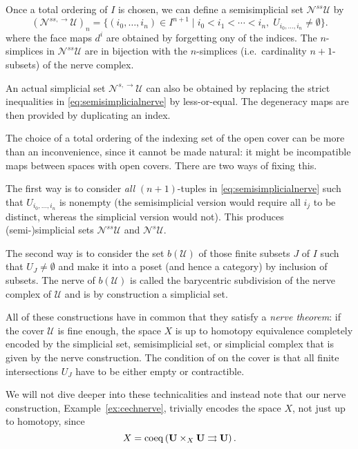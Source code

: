 \documentclass[a4paper,openany]{scrbook}
\begin{document}
Once a total ordering of $I$ is chosen, we can define a semisimplicial set $\mathcal N^{ss}\mathcal U$ by
\begin{equation}\label{eq:semisimplicialnerve}
(\mathcal N^{ss,\to}\mathcal U)_n = \{ (i_0,\dots,i_n) \in I^{n+1} \mid i_0 < i_1 < \cdots < i_n,\; U_{i_0,\dots,i_n} \neq \emptyset\}.
\end{equation}
where the face maps $d^i$ are obtained by forgetting ony of the indices. The $n$-simplices in $\mathcal N^{ss}\mathcal U$ are in bijection with the $n$-simplices (i.e.\ cardinality $n+1$-subsets) of the nerve complex.

An actual simplicial set $\mathcal N^{s,\to}\mathcal U$ can also be obtained by replacing the strict inequalities in \eqref{eq:semisimplicialnerve} by less-or-equal. The degeneracy maps are then provided by duplicating an index.

The choice of a total ordering of the indexing set of the open cover can be more than an inconvenience, since it cannot be made natural: it might be incompatible maps between spaces with open covers. There are two ways of fixing this. 

The first way is to consider \emph{all} $(n+1)$-tuples in \eqref{eq:semisimplicialnerve} such that $U_{i_0,\dots,i_n}$ is nonempty (the semisimplicial version would require all $i_j$ to be distinct, whereas the simplicial version would not). This produces (semi-)simplicial sets $\mathcal N^{ss}\mathcal U$ and $\mathcal N^s\mathcal U$.

The second way is to consider the set $b(\mathcal U)$ of those finite subsets $J$ of $I$ such that $U_J \neq \emptyset$ and make it into a poset (and hence a category) by inclusion of subsets. 
The nerve of $b(\mathcal U)$ is called the barycentric subdivision of the nerve complex of $\mathcal U$ and is by construction a simplicial set.

All of these constructions have in common that they satisfy a \emph{nerve theorem}: if the cover $\mathcal U$ is fine enough, the space $X$ is up to homotopy equivalence completely encoded by the simplicial set, semisimplicial set, or simplicial complex that is given by the nerve construction. The condition of on the cover is that all finite intersections $U_J$ have to be either empty or contractible.

We will not dive deeper into these technicalities and instead note that our nerve construction, Example~\ref{ex:cechnerve}, trivially encodes the space $X$, not just up to homotopy, since
\[
X = \operatorname{coeq} \left( \mathbf U \times_X \mathbf U \rightrightarrows \mathbf U\right).
\]
\end{document}
